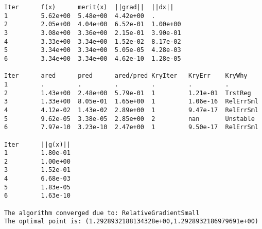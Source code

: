 \begin{lstlisting}[style=OptizelleOutput,caption={Output generated by Optizelle when running the simple equality example.  We explain this output in Chapter \ref{ch:Output}.},label=lst:simpleEqOut]
Iter      f(x)      merit(x)  ||grad||  ||dx||    
1         5.62e+00  5.48e+00  4.42e+00  .         
2         2.05e+00  4.04e+00  6.52e-01  1.00e+00  
3         3.08e+00  3.36e+00  2.15e-01  3.90e-01  
4         3.33e+00  3.34e+00  1.52e-02  8.17e-02  
5         3.34e+00  3.34e+00  5.05e-05  4.28e-03  
6         3.34e+00  3.34e+00  4.62e-10  1.28e-05  

Iter      ared      pred      ared/pred KryIter   KryErr    KryWhy    
1         .         .         .         .         .         .         
2         1.43e+00  2.48e+00  5.79e-01  1         1.21e-01  TrstReg   
3         1.33e+00  8.05e-01  1.65e+00  1         1.06e-16  RelErrSml 
4         4.12e-02  1.43e-02  2.89e+00  1         9.47e-17  RelErrSml 
5         9.62e-05  3.38e-05  2.85e+00  2         nan       Unstable  
6         7.97e-10  3.23e-10  2.47e+00  1         9.50e-17  RelErrSml 

Iter      ||g(x)||  
1         1.80e-01  
2         1.00e+00  
3         1.52e-01  
4         6.68e-03  
5         1.83e-05  
6         1.63e-10  
                    
The algorithm converged due to: RelativeGradientSmall
The optimal point is: (1.2928932188134328e+00,1.2928932186979691e+00)
\end{lstlisting}
